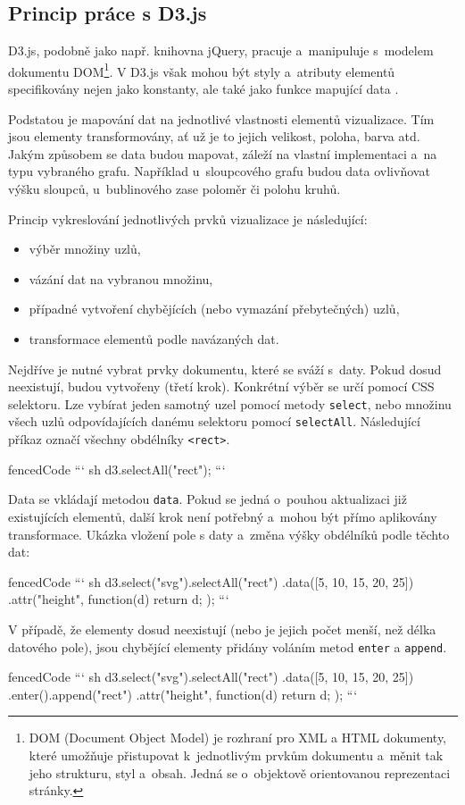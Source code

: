 \documentclass[
  digital, %
  oneside, %
  table,   %
  nolof,     %
  nolot,     %
  nocover
]{fithesis3}
\begin{document}
\subsection{Princip práce s D3.js}
D3.js, podobně jako např. knihovna jQuery, pracuje a~manipuluje s~modelem dokumentu DOM\footnote{DOM (Document Object Model) je rozhraní pro XML a HTML dokumenty, které umožňuje přistupovat k~jednotlivým prvkům dokumentu a~měnit tak jeho strukturu, styl a~obsah. Jedná se o~objektově orientovanou reprezentaci stránky.}. V D3.js však mohou být styly a~atributy elementů specifikovány nejen jako konstanty, ale také jako funkce mapující data \cite{d3jsorg}.\par
Podstatou je mapování dat na jednotlivé vlastnosti elementů vizualizace. Tím jsou elementy transformovány, ať už je to jejich velikost, poloha, barva atd. Jakým způsobem se data budou mapovat, záleží na vlastní implementaci a~na typu vybraného grafu. Například u~sloupcového grafu budou data ovlivňovat výšku sloupců, u~bublinového zase poloměr či polohu kruhů. \cite{interactiveVisualizationBook}\par
Princip vykreslování jednotlivých prvků vizualizace je následující:
\begin{itemize}
  \item výběr množiny uzlů,
  \item vázání dat na vybranou množinu,
  \item případné vytvoření chybějících (nebo vymazání přebytečných) uzlů,
  \item transformace elementů podle navázaných dat.
\end{itemize}
Nejdříve je nutné vybrat prvky dokumentu, které se sváží s~daty. Pokud dosud neexistují, budou vytvořeny (třetí krok). Konkrétní výběr se určí pomocí CSS selektoru.
Lze vybírat jeden samotný uzel pomocí metody \verb|select|, nebo množinu všech uzlů odpovídajících danému selektoru pomocí \verb|selectAll|. Následující příkaz označí všechny obdélníky \verb|<rect>|.
\begin{markdown*}{
  fencedCode
}
``` sh
	d3.selectAll("rect"); 
```
\end{markdown*}
Data se vkládají metodou \verb|data|. Pokud se jedná o~pouhou aktualizaci již existujících elementů, další krok není potřebný a~mohou být přímo aplikovány transformace. Ukázka vložení pole s daty a~změna výšky obdélníků podle těchto dat:
\begin{markdown*}{
  fencedCode
}
``` sh
	d3.select("svg").selectAll("rect")
	  .data([5, 10, 15, 20, 25])
	  .attr("height", function(d) { return d; });
```
\end{markdown*}
V případě, že elementy dosud neexistují (nebo je jejich počet menší, než délka datového pole), jsou chybějící elementy přidány voláním metod \verb|enter| a \verb|append|.
\begin{markdown*}{
  fencedCode
}
``` sh
	d3.select("svg").selectAll("rect")
	  .data([5, 10, 15, 20, 25])
	  .enter().append("rect")
	  .attr("height", function(d) { return d; });
```
\end{markdown*}
\end{document}
